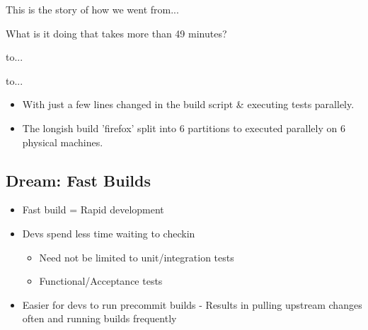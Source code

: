 \documentclass{beamer}
\begin{document}
\begin{frame}{This is the story of how we went from...}
  \begin{centering}
    \par
    \pause
    \begin{center}
      What is it doing that takes more than 49 minutes?
    \end{center}
  \end{centering}
\end{frame}

\begin{frame}{to...}
  \begin{centering}
    \par
  \end{centering}
\end{frame}

\begin{frame}{to...}
  \begin{centering}
    \par
  \end{centering}
\end{frame}

\begin{frame}
  \begin{centering}
    \begin{itemize}
    \item With just a few lines changed in the build script \& executing tests parallely.
      \pause
    \item The longish build 'firefox' split into 6 partitions to executed parallely on 6 physical machines.
    \end{itemize}
  \end{centering}
\end{frame}

\subsection{Dream: Fast Builds}

\begin{frame}
  \begin{centering}
    \begin{itemize}
    \item Fast build = Rapid development
      \pause
    \item Devs spend less time waiting to checkin
      \begin{itemize}
      \item Need not be limited to unit/integration tests          
      \item Functional/Acceptance tests
      \end{itemize}
      \pause
    \item Easier for devs to run precommit builds - Results in pulling upstream changes often and running builds frequently
    \end{itemize}
  \end{centering}
\end{frame}
\end{document}
